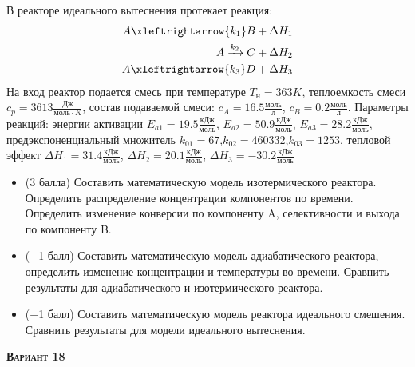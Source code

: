  В реакторе идеального вытеснения протекает реакция: \begin{equation*} \begin{aligned} A \xleftrightarrow{k_1} B + \Delta H_1 \\ A \xrightarrow{k_2} C + \Delta H_2 \\ A \xleftrightarrow{k_3} D + \Delta H_3 \end{aligned} \end{equation*} На вход  реактор подается смесь при температуре $ T_н =  363 K$, теплоемкость смеси $c_p= 3613 \frac{Дж}{моль \cdot K}$, состав подаваемой смеси: $c_A=16.5 \frac{моль}{л}$, $c_B=0.2 \frac{моль}{л}$. Параметры реакций: энергии активации $E_{a1}=19.5 \frac{кДж}{моль}$, $E_{a2}=50.9  \frac{кДж}{моль}$, $E_{a3}=28.2  \frac{кДж}{моль}$, предэкспоненциальный множитель $k_{01}=        67$,$k_{02}=    460332$,$k_{03}=      1253$, тепловой эффект $\Delta H_1= 31.4 \frac{кДж}{моль}$, $\Delta H_2=20.1 \frac{кДж}{моль}$, $\Delta H_3 = -30.2 \frac{кДж}{моль}$\begin{itemize} \item (3 балла) Составить математическую модель изотермического реактора. Определить распределение концентрации компонентов по времени. Определить изменение конверсии по компоненту A, селективности и выхода по компоненту B. \item (+1 балл) Составить математическую модель адиабатического реактора, определить изменение концентрации и температуры во времени. Сравнить результаты для адиабатического и изотермического реактора. \item (+1 балл) Составить математическую модель реактора идеального смешения. Сравнить результаты для модели идеального вытеснения. \end{itemize}

\textsc{\textbf{Вариант 18}}

